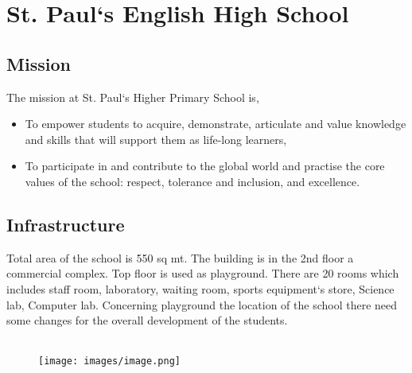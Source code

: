 \section{St. Paul`s English High School}

\subsection{Mission}
The mission at St. Paul`s Higher Primary School is,
\begin{itemize}
    \item To empower students to acquire, demonstrate, articulate and value knowledge and skills that will support them as life-long learners, 
    \item To participate in and contribute to the global world and practise the core values of the school: respect, tolerance and inclusion, and excellence.
\end{itemize}
\subsection{Infrastructure}
Total area of the school is 550 sq mt. The building is in the 2nd floor a commercial complex. Top floor is used as playground. There are 20 rooms which includes staff room, laboratory, waiting room, sports equipment`s store, Science lab, Computer lab. Concerning playground the location of the school there need some changes for the overall development of the students.\\ \\ 
\begin{figure}[H]
    \centering
    \texttt{[image: images/image.png]}
\end{figure}
\newpage 
